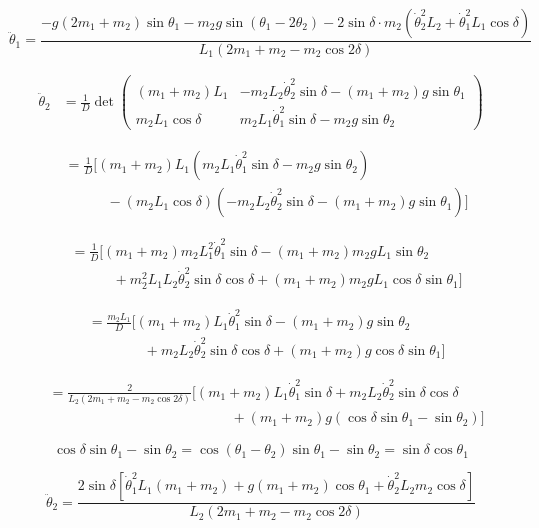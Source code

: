 \documentclass[10pt]{article}
\begin{document}
\[
\ddot{\theta}_1 = \frac{-g(2m_1 + m_2)\sin\theta_1 - m_2 g \sin(\theta_1 - 2\theta_2) - 2\sin\delta \cdot m_2(\dot{\theta}_2^2 L_2 + \dot{\theta}_1^2 L_1 \cos\delta)}{L_1(2m_1 + m_2 - m_2\cos 2\delta)}
\]


\begin{align*}
\ddot{\theta}_2 &= \frac{1}{D} \det \begin{pmatrix}
(m_1 + m_2) L_1 & -m_2 L_2 \dot{\theta}_2^2 \sin\delta - (m_1 + m_2) g \sin\theta_1 \\
m_2 L_1 \cos\delta & m_2 L_1 \dot{\theta}_1^2 \sin\delta - m_2 g \sin\theta_2
\end{pmatrix}
\end{align*}

\begin{align*}
&= \frac{1}{D} \Big[ (m_1 + m_2) L_1 \left( m_2 L_1 \dot{\theta}_1^2 \sin\delta - m_2 g \sin\theta_2 \right) \\
&\qquad\quad - (m_2 L_1 \cos\delta) \left( -m_2 L_2 \dot{\theta}_2^2 \sin\delta - (m_1 + m_2) g \sin\theta_1 \right) \Big]
\end{align*}

\begin{align*}
&= \frac{1}{D} \Big[ (m_1 + m_2) m_2 L_1^2 \dot{\theta}_1^2 \sin\delta - (m_1 + m_2) m_2 g L_1 \sin\theta_2 \\
&\qquad\quad + m_2^2 L_1 L_2 \dot{\theta}_2^2 \sin\delta \cos\delta + (m_1 + m_2) m_2 g L_1 \cos\delta \sin\theta_1 \Big]
\end{align*}

\begin{align*}
&= \frac{m_2 L_1}{D} \Big[ (m_1 + m_2) L_1 \dot{\theta}_1^2 \sin\delta - (m_1 + m_2) g \sin\theta_2 \\
&\qquad\qquad + m_2 L_2 \dot{\theta}_2^2 \sin\delta \cos\delta + (m_1 + m_2) g \cos\delta \sin\theta_1 \Big]
\end{align*}

\begin{align*}
&= \frac{2}{L_2(2m_1 + m_2 - m_2 \cos 2\delta)} \Big[ (m_1 + m_2) L_1 \dot{\theta}_1^2 \sin\delta + m_2 L_2 \dot{\theta}_2^2 \sin\delta \cos\delta \\
&\qquad\qquad\qquad\qquad\qquad\qquad\quad + (m_1 + m_2) g (\cos\delta \sin\theta_1 - \sin\theta_2) \Big]
\end{align*}

\[
\cos\delta \sin\theta_1 - \sin\theta_2 = \cos(\theta_1 - \theta_2)\sin\theta_1 - \sin\theta_2 = \sin\delta \cos\theta_1
\]

\[
\ddot{\theta}_2 = \frac{2\sin\delta \left[ \dot{\theta}_1^2 L_1 (m_1 + m_2) + g(m_1 + m_2)\cos\theta_1 + \dot{\theta}_2^2 L_2 m_2 \cos\delta \right]}{L_2(2m_1 + m_2 - m_2\cos 2\delta)}
\]
\end{document}

